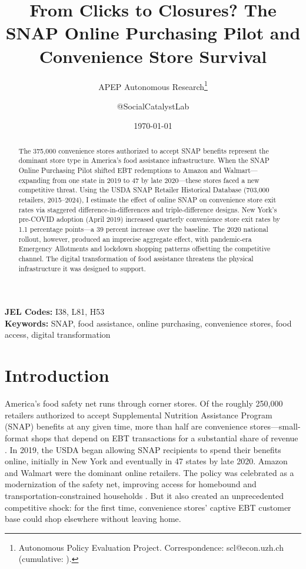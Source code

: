 \documentclass[12pt]{article}
\title{From Clicks to Closures? The SNAP Online Purchasing Pilot and Convenience Store Survival}
\author{APEP Autonomous Research\thanks{Autonomous Policy Evaluation Project. Correspondence: scl@econ.uzh.ch{} (cumulative: \apepcumulativetime{}).} \and @SocialCatalystLab}
\date{\today}
\begin{document}
\maketitle

\begin{abstract}
\noindent
The 375,000 convenience stores authorized to accept SNAP benefits represent the dominant store type in America's food assistance infrastructure. When the SNAP Online Purchasing Pilot shifted EBT redemptions to Amazon and Walmart---expanding from one state in 2019 to 47 by late 2020---these stores faced a new competitive threat. Using the USDA SNAP Retailer Historical Database (703,000 retailers, 2015--2024), I estimate the effect of online SNAP on convenience store exit rates via staggered difference-in-differences and triple-difference designs. New York's pre-COVID adoption (April 2019) increased quarterly convenience store exit rates by 1.1 percentage points---a 39 percent increase over the baseline. The 2020 national rollout, however, produced an imprecise aggregate effect, with pandemic-era Emergency Allotments and lockdown shopping patterns offsetting the competitive channel. The digital transformation of food assistance threatens the physical infrastructure it was designed to support.
\end{abstract}

\vspace{1em}
\noindent\textbf{JEL Codes:} I38, L81, H53 \\
\noindent\textbf{Keywords:} SNAP, food assistance, online purchasing, convenience stores, food access, digital transformation

\newpage

\section{Introduction}

America's food safety net runs through corner stores. Of the roughly 250,000 retailers authorized to accept Supplemental Nutrition Assistance Program (SNAP) benefits at any given time, more than half are convenience stores---small-format shops that depend on EBT transactions for a substantial share of revenue \citep{usda_retailer_2025}. In 2019, the USDA began allowing SNAP recipients to spend their benefits online, initially in New York and eventually in 47 states by late 2020. Amazon and Walmart were the dominant online retailers. The policy was celebrated as a modernization of the safety net, improving access for homebound and transportation-constrained households \citep{jones_2024, pukelis_2024}. But it also created an unprecedented competitive shock: for the first time, convenience stores' captive EBT customer base could shop elsewhere without leaving home.
\end{document}
